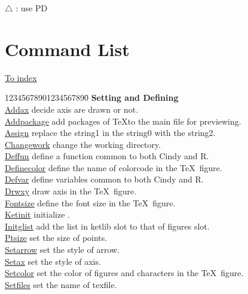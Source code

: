 \documentclass[papersize,a4paper,12pt]{article}
\begin{document}
\begin{center}

\end{center}

\hspace{20mm} $\triangle$ : use PD

\newpage

\hypertarget{functionlist}{}
\section{Command List}
\hyperlink{index}{To index}

\begin{tabbing}
12345678901234567890\=\kill
{\bf Setting and Defining} \> \\
\hyperlink{addax}{Addax} \> decide axis are drawn or not.\\
\hyperlink{addpackage}{Addpackage} \> add packages of \TeX to the main file  for previewing.\\
\hyperlink{assign}{Assign} \> replace the string1 in the string0 with the string2.\\
\hyperlink{changework}{Changework} \> change the working directory.\\
\hyperlink{deffun}{Deffun} \> define a function common to both Cindy and R.\\
\hyperlink{definecolor}{Definecolor} \> define the name of colorcode in the \TeX\ figure.\\
\hyperlink{defvar}{Defvar} \> define variables common to both Cindy and R.\\
\hyperlink{drwxy}{Drwxy} \> draw axis in the \TeX\ figure.\\
\hyperlink{fontsize}{Fontsize} \> define the font size in the \TeX\ figure.\\
\hyperlink{ketinit}{Ketinit} \> initialize \ketcindy.\\
\hyperlink{initglist}{Initglist} \> add the list in ketlib slot to that of figures slot.\\
\hyperlink{ptsize}{Ptsize}  \> set the size of points.\\
\hyperlink{setarrow}{Setarrow} \> set the style of arrow.\\
\hyperlink{setax}{Setax} \> set the style of axis.\\
\hyperlink{setcolor}{Setcolor} \> set the color of figures and characters in the \TeX\ figure.\\
\hyperlink{setfiles}{Setfiles} \> set the name of texfile.\\

\end{tabbing}
\end{document}
